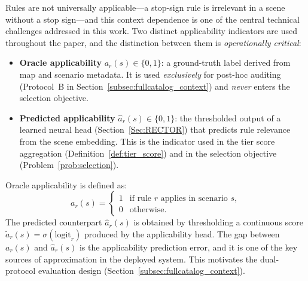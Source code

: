 Rules are not universally applicable---a stop-sign rule is irrelevant in a scene without a stop sign---and this context dependence is one of the central technical challenges addressed in this work.  Two distinct applicability indicators are used throughout the paper, and the distinction between them is
\emph{operationally critical}:
\begin{itemize}[leftmargin=1.5em]
\item \textbf{Oracle applicability} $a_r(s)\in\{0,1\}$: a ground-truth   label derived from map and scenario metadata.  It is used \emph{exclusively} for post-hoc auditing (Protocol~B in Section~\ref{subsec:fullcatalog_context}) and \emph{never} enters the selection objective.
\item \textbf{Predicted applicability} $\hat{a}_r(s)\in\{0,1\}$: the
  thresholded output of a learned neural head (Section~\ref{Sec:RECTOR}) that
  predicts rule relevance from the scene embedding.  This is the indicator
  used in the tier score aggregation (Definition~\ref{def:tier_score}) and in
  the selection objective (Problem~\ref{prob:selection}).
\end{itemize}
\noindent
Oracle applicability is defined as:
\begin{equation}
a_r(s)=
\begin{cases}
1 & \text{if rule $r$ applies in scenario $s$},\\
0 & \text{otherwise.}
\end{cases}
\end{equation}
The predicted counterpart $\hat{a}_r(s)$ is obtained by thresholding a continuous score $\tilde{a}_r(s) = \sigma(\text{logit}_r)$ produced by the applicability head.  The gap between $a_r(s)$ and $\hat{a}_r(s)$ is the applicability prediction error, and it is one of the key sources of approximation in the deployed system.  This motivates the dual-protocol evaluation design (Section~\ref{subsec:fullcatalog_context}).

